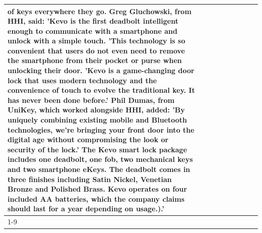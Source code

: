\begin{table}[H]
\begin{tabular}{lllrlllll}
of keys everywhere they go. Greg Gluchowski, from HHI, said: 'Kevo is the first deadbolt intelligent enough to communicate with a smartphone and unlock with a simple touch. 'This technology is so convenient that users do not even need to remove the smartphone from their pocket or purse when unlocking their door. 'Kevo is a game-changing door lock that uses modern technology and the convenience of touch to evolve the traditional key. It has never been done before.' Phil Dumas, from UniKey, which worked alongside HHI, added: 'By uniquely combining existing mobile and Bluetooth technologies, we’re bringing your front door into the digital age without compromising the look or security of the lock.' The Kevo smart lock package includes one deadbolt, one fob, two mechanical keys and two smartphone eKeys. The deadbolt comes in three finishes including Satin Nickel, Venetian Bronze and Polished Brass. Kevo operates on four included AA batteries, which the company claims should last for a year depending on usage.).' \\
\cline{1-9}

\end{tabular}
\end{table}
